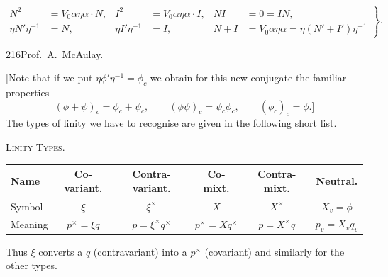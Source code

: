 \documentclass[11pt]{article}
\begin{document}
\begin{equation}\left.\begin{aligned}
N^2&=V_0\alpha\eta\alpha\cdot N,&I^2&=V_0\alpha\eta\alpha\cdot I,&NI&=0=IN,\\
\eta N'\eta^{-1}&=N,&\eta I'\eta^{-1}&=I,&N+I&=V_0\alpha\eta\alpha=\eta(N'+I')\eta^{-1}
\end{aligned}\right\}.\tag{7}\end{equation}
\newpage\thispagestyle{empty}\begin{center}216\hfill Prof.\ A.\ McAulay.\end{center}
[Note that if we put $\eta\phi'\eta^{-1}=\phi_c$ we obtain for this new conjugate the familiar properties
\[
(\phi+\psi)_c=\phi_c+\psi_c,\qquad(\phi\psi)_c=\psi_c\phi_c,\qquad(\phi_c)_c=\phi.]
\]
The types of linity we have to recognise are given in the following short list.
\begin{center}\textsc{Linity Types.}\end{center}
\begin{center}\begin{tabular}{|l|c|c|c|c|c|}\hline
Name & Co-variant. & Contra-variant. & Co-mixt. & Contra-mixt. & Neutral.\\\hline
Symbol & $\xi$ & $\xi^\times$ & $X$ & $X^\times$ & $X_v=\phi$\\
Meaning & $p^\times=\xi q$ & $p=\xi^\times q^\times$ & $p^\times=Xq^\times$ & $p=X^\times q$ & $p_v=X_vq_v$\\\hline
\end{tabular}\end{center}
Thus $\xi$ converts a $q$ (contravariant) into a $p^\times$ (covariant) and similarly for the other types.
\end{document}

